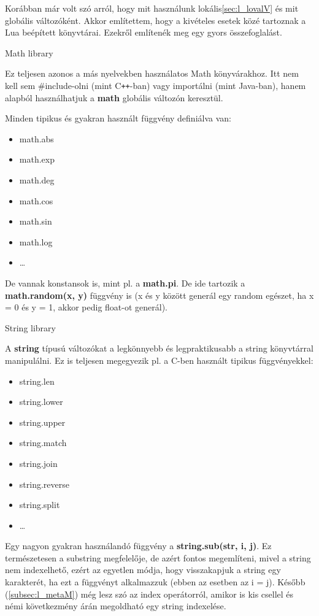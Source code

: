 Korábban már volt szó arról, hogy mit használunk lokális\ref{sec:l_lovalV} és mit globális változóként. Akkor említettem, hogy a kivételes esetek közé tartoznak a Lua beépített könyvtárai. Ezekről említenék meg egy gyors összefoglalást.

\newpage

\Large Math library \normalsize

\bigskip

Ez teljesen azonos a más nyelvekben használatos Math könyvárakhoz. Itt nem kell sem \#include-olni (mint C\verb|++|-ban) vagy importálni (mint Java-ban), hanem alapból használhatjuk a \textbf{math} globális változón keresztül.

Minden tipikus és gyakran használt függvény definiálva van:
\begin{itemize}
	\item math.abs
	\item math.exp
	\item math.deg
	\item math.cos
	\item math.sin
	\item math.log
	\item \dots
\end{itemize}
De vannak konstansok is, mint pl. a \textbf{math.pi}. De ide tartozik a \textbf{math.random(x, y)} függvény is (x és y között generál egy random egészet, ha x = 0 és y = 1, akkor pedig float-ot generál). 

\bigskip

\Large String library \normalsize

\bigskip

A \textbf{string} típusú változókat a legkönnyebb és legpraktikusabb a string könyvtárral manipulálni. Ez is teljesen megegyezik pl. a C-ben használt tipikus függvényekkel:
\begin{itemize}
	\item string.len
	\item string.lower
	\item string.upper
	\item string.match
	\item string.join
	\item string.reverse
	\item string.split
	\item \dots
\end{itemize}
Egy nagyon gyakran használandó függvény a \textbf{string.sub(str, i, j)}. Ez természetesen a substring megfelelője, de azért fontos megemlíteni, mivel a string nem indexelhető, ezért az egyetlen módja, hogy visszakapjuk a string egy karakterét, ha ezt a függvényt alkalmazzuk (ebben az esetben az i = j). Később (\ref{subsec:l_metaM}) még lesz szó az index operátorról, amikor is kis csellel és némi következmény árán megoldható egy string indexelése.

